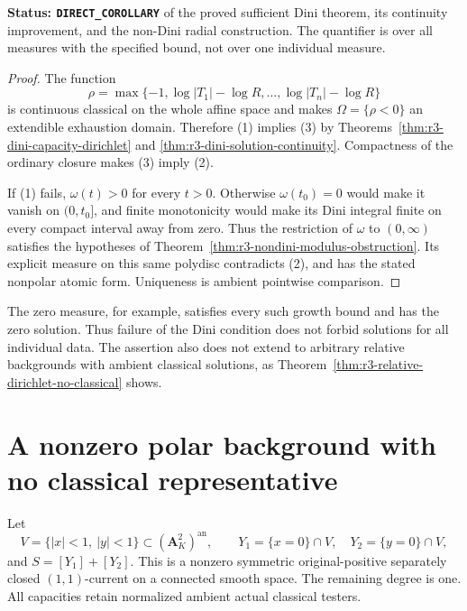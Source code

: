 \documentclass[11pt,a4paper]{article}
\numberwithin{equation}{section}
\theoremstyle{definition}
\theoremstyle{remark}
\newcommand{\an}{\mathrm{an}}
\begin{document}
\noindent\textbf{Status: \texttt{DIRECT\_COROLLARY}} of the
proved sufficient Dini theorem, its continuity improvement, and
the non-Dini radial construction. The quantifier is over all
measures with the specified bound, not over one individual measure.

\begin{proof}
The function
\[
 \rho=\max\{-1,\log|T_1|-\log R,\ldots,
                          \log|T_n|-\log R\}
\]
is continuous classical on the whole affine space and makes
$\Omega=\{\rho<0\}$ an extendible exhaustion domain. Therefore
(1) implies (3) by Theorems~\ref{thm:r3-dini-capacity-dirichlet}
and \ref{thm:r3-dini-solution-continuity}. Compactness of the
ordinary closure makes (3) imply (2).

If (1) fails, $\omega(t)>0$ for every $t>0$. Otherwise
$\omega(t_0)=0$ would make it vanish on $(0,t_0]$, and finite
monotonicity would make its Dini integral finite on every compact
interval away from zero. Thus the restriction of $\omega$ to
$(0,\infty)$ satisfies the hypotheses of
Theorem~\ref{thm:r3-nondini-modulus-obstruction}. Its explicit
measure on this same polydisc contradicts (2), and has the stated
nonpolar atomic form. Uniqueness is ambient pointwise comparison.
\end{proof}

The zero measure, for example, satisfies every such growth bound
and has the zero solution. Thus failure of the Dini condition
does not forbid solutions for all individual data. The assertion
also does not extend to arbitrary relative backgrounds with ambient
classical solutions, as
Theorem~\ref{thm:r3-relative-dirichlet-no-classical} shows.



\section{A nonzero polar background with no classical representative}
\label{sec:r3-relative-representative-obstruction}

Let
\[
 V=\{|x|<1,\ |y|<1\}\subset(\mathbf A_K^2)^{\an},
 \qquad Y_1=\{x=0\}\cap V,\quad Y_2=\{y=0\}\cap V,
\]
and $S=[Y_1]+[Y_2]$. This is a nonzero symmetric original-positive
separately closed $(1,1)$-current on a connected smooth space.
The remaining degree is one. All capacities retain normalized
ambient actual classical testers.
\end{document}
